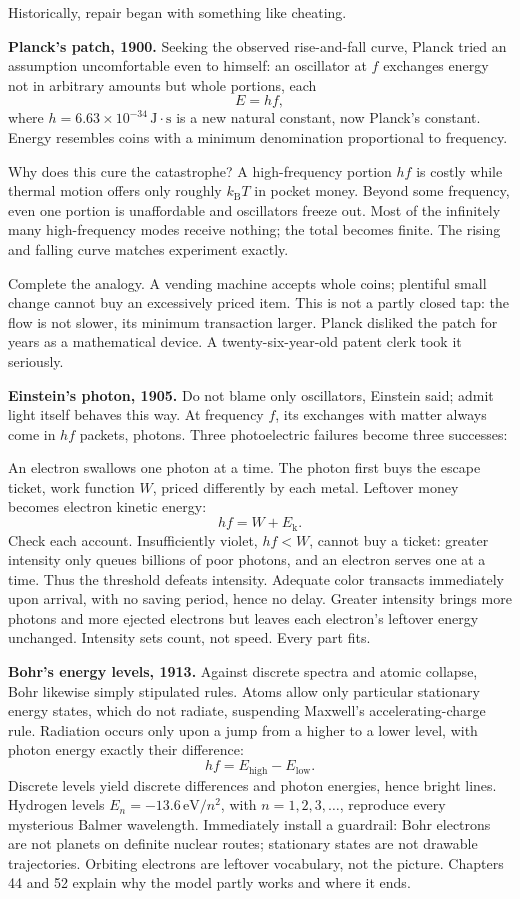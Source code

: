 
Historically, repair began with something like cheating.

\textbf{Planck's patch, 1900.} Seeking the observed rise-and-fall curve, Planck tried an assumption uncomfortable even to himself: an oscillator at \(f\) exchanges energy not in arbitrary amounts but whole portions, each
\[
E = hf,
\]
where \(h = 6.63\times 10^{-34}\,\mathrm{J\cdot s}\) is a new natural constant, now Planck's constant. Energy resembles coins with a minimum denomination proportional to frequency.

Why does this cure the catastrophe? A high-frequency portion \(hf\) is costly while thermal motion offers only roughly \(k_{\mathrm{B}}T\) in pocket money. Beyond some frequency, even one portion is unaffordable and oscillators freeze out. Most of the infinitely many high-frequency modes receive nothing; the total becomes finite. The rising and falling curve matches experiment exactly.

Complete the analogy. A vending machine accepts whole coins; plentiful small change cannot buy an excessively priced item. This is not a partly closed tap: the flow is not slower, its minimum transaction larger. Planck disliked the patch for years as a mathematical device. A twenty-six-year-old patent clerk took it seriously.

\textbf{Einstein's photon, 1905.} Do not blame only oscillators, Einstein said; admit light itself behaves this way. At frequency \(f\), its exchanges with matter always come in \(hf\) packets, photons. Three photoelectric failures become three successes:

An electron swallows one photon at a time. The photon first buys the escape ticket, work function \(W\), priced differently by each metal. Leftover money becomes electron kinetic energy:
\[
hf = W + E_{\mathrm{k}}.
\]
Check each account. Insufficiently violet, \(hf < W\), cannot buy a ticket: greater intensity only queues billions of poor photons, and an electron serves one at a time. Thus the threshold defeats intensity. Adequate color transacts immediately upon arrival, with no saving period, hence no delay. Greater intensity brings more photons and more ejected electrons but leaves each electron's leftover energy unchanged. Intensity sets count, not speed. Every part fits.

\textbf{Bohr's energy levels, 1913.} Against discrete spectra and atomic collapse, Bohr likewise simply stipulated rules. Atoms allow only particular stationary energy states, which do not radiate, suspending Maxwell's accelerating-charge rule. Radiation occurs only upon a jump from a higher to a
lower level, with photon energy exactly their difference:
\[
hf = E_{\text{high}} - E_{\text{low}}.
\]
Discrete levels yield discrete differences and photon energies, hence bright lines. Hydrogen levels \(E_n = -13.6\,\mathrm{eV}/n^2\), with \(n = 1, 2, 3, \dots\), reproduce every mysterious Balmer wavelength. Immediately install a guardrail: Bohr electrons are not planets on definite nuclear routes; stationary states are not drawable trajectories. Orbiting electrons are leftover vocabulary, not the picture. Chapters 44 and 52 explain why the model partly works and where it ends.

